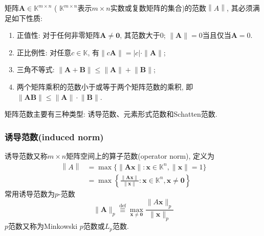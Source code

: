 \documentclass[lang=cn,10pt]{gorgeousnbook}
\numberwithin{equation}{section}%
\numberwithin{figure}{section}%
\begin{document}
\begin{theorem}
矩阵$\bm{A}\in\mathbb{K}^{m\times n}$ ( $\mathbb{K}^{m\times n}$表示$m\times n$实数或复数矩阵的集合)的范数$\left\|A\right\|$,  其必须满足如下性质:
\begin{enumerate}[(1)]
\item 正值性: 对于任何非零矩阵$\bm{A}\neq \bm{0}$, 其范数大于0; $\|\bm{A}\|=0$当且仅当$\bm{A} = 0$. 
\item 正比例性: 对任意$c\in \mathbb{K}$, 有$\|c\boldsymbol{A}\|=|c|\cdot\|\boldsymbol{A}\|$;
\item 三角不等式: $\lVert \bm{A}+\bm{B}\rVert\leqslant\lVert \bm{A}\rVert+\lVert \bm{B}\rVert $;
\item 两个矩阵乘积的范数小于或等于两个矩阵范数的乘积, 即$\lVert \bm{AB}\rVert\leqslant\lVert \bm{A}\rVert\cdot\lVert \bm{B}\rVert $. 
\end{enumerate}
\end{theorem}
矩阵范数主要有三种类型: 诱导范数、元素形式范数和Schatten范数. 

\subsubsection{诱导范数(induced norm)}
诱导范数又称$m\times n $矩阵空间上的算子范数(operator norm), 定义为
\begin{equation}
\begin{aligned}
\left\|A\right\|& =\max\{\|\boldsymbol{Ax}\|:\boldsymbol{x}\in\mathbb{K}^n,\|\boldsymbol{x}\|=1\}  \\
&=\max\left\{\frac{\|\boldsymbol{Ax}\|}{\|\boldsymbol{x}\|}:\boldsymbol{x}\in\mathbb{K}^n,\boldsymbol{x}\neq\boldsymbol{0}\right\}
\end{aligned}
\end{equation}
常用诱导范数为$p$-范数
\begin{equation}
\|\boldsymbol{A}\|_p\overset{\mathrm{def}}{\operatorname*{\equiv}}\max_{\boldsymbol{x}\neq\boldsymbol{0}}\frac{\|A\boldsymbol{x}\|_p}{\|\boldsymbol{x}\|_p}
\end{equation}
$p$范数又称为Minkowski $p$范数或$L_p$范数.
\end{document}
